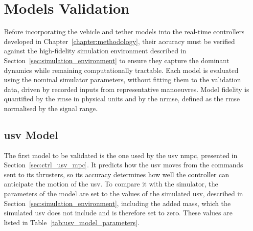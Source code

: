
\section{Models Validation}
\label{sec:model_validation}

Before incorporating the vehicle and tether models into the real-time controllers developed in Chapter~\ref{chapter:methodology}, their accuracy must be verified against the high-fidelity simulation environment described in Section~\ref{sec:simulation_environment} to ensure they capture the dominant dynamics while remaining computationally tractable. Each model is evaluated using the nominal simulator parameters, without fitting them to the validation data, driven by recorded inputs from representative manoeuvres. Model fidelity is quantified by the \gls{rmse} in physical units and by the \gls{nrmse}, defined as the \gls{rmse} normalised by the signal range.

\subsection{\texorpdfstring{\gls{usv} Model}{USV Model}}
\label{subsec:usv_validation}

The first model to be validated is the one used by the \gls{usv} \gls{nmpc}, presented in Section~\ref{sec:ctrl_usv_mpc}. It predicts how the \gls{usv} moves from the commands sent to its thrusters, so its accuracy determines how well the controller can anticipate the motion of the \gls{usv}. To compare it with the simulator, the parameters of the model are set to the values of the simulated \gls{usv}, described in Section~\ref{sec:simulation_environment}, including the added mass, which the simulated \gls{usv} does not include and is therefore set to zero. These values are listed in Table~\ref{tab:usv_model_parameters}.

